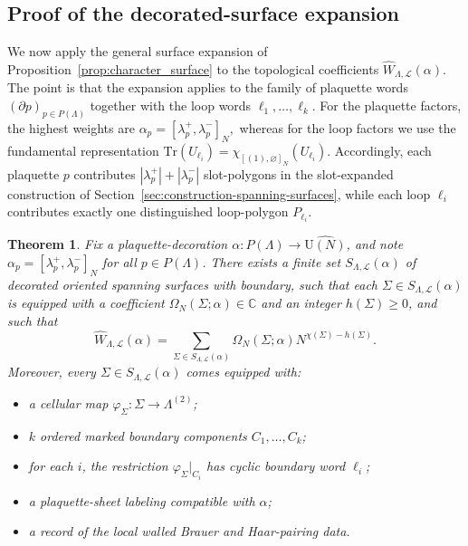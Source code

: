 \documentclass[11pt,a4paper,reqno]{article}
\newtheorem{theorem}{Theorem}[section]
\theoremstyle{definition}
\theoremstyle{remark}
\newcommand\U{{\mathrm U}}
\newcommand\Tr{\mathrm{Tr}}
\newcommand\Lc{{\mathcal{L}}}
\begin{document}
\subsection{Proof of the decorated-surface expansion}

We now apply the general surface expansion of Proposition~\ref{prop:character_surface} to the topological coefficients $\widehat{W}_{\Lambda,\Lc}(\alpha)$. The point is that the expansion applies to the family of plaquette words $(\partial p)_{p\in P(\Lambda)}$ together with the loop words $\ell_1,\dots,\ell_k$. For the plaquette factors, the highest weights are $\alpha_p=[\lambda_p^+,\lambda_p^-]_N,$ whereas for the loop factors we use the fundamental representation $\Tr(U_{\ell_i})=\chi_{[(1),\varnothing]_N}(U_{\ell_i}).$ Accordingly, each plaquette $p$ contributes $|\lambda_p^+|+|\lambda_p^-|$ slot-polygons in the slot-expanded construction of Section~\ref{sec:construction-spanning-surfaces}, while each loop $\ell_i$ contributes exactly one distinguished loop-polygon $P_{\ell_i}$.

\begin{theorem}\label{thm:fixed-alpha-punctured-sum}
Fix a plaquette-decoration $\alpha:P(\Lambda)\to \widehat{\U(N)}$, and note $\alpha_p=[\lambda_p^+,\lambda_p^-]_N$ for all $p\in P(\Lambda)$. There exists a finite set $S_{\Lambda,\Lc}(\alpha)$ of decorated oriented spanning surfaces with boundary, such that each $\Sigma\in S_{\Lambda,\Lc}(\alpha)$ is equipped with a coefficient $\Omega_N(\Sigma;\alpha)\in\mathbb C$ and an integer $h(\Sigma)\geq 0$, and such that
\begin{equation}
\widehat{W}_{\Lambda,\Lc}(\alpha)=\sum_{\Sigma\in S_{\Lambda,\Lc}(\alpha)}\Omega_N(\Sigma;\alpha) N^{\chi(\Sigma)-h(\Sigma)}.
\end{equation}
Moreover, every $\Sigma\in S_{\Lambda,\Lc}(\alpha)$ comes equipped with:
\begin{itemize}
\item a cellular map $\varphi_\Sigma:\Sigma\to \Lambda^{(2)}$;
\item $k$ ordered marked boundary components $C_1,\dots,C_k$;
\item for each $i$, the restriction $\varphi_\Sigma|_{C_i}$ has cyclic boundary word $\ell_i$;
\item a plaquette-sheet labeling compatible with $\alpha$;
\item a record of the local walled Brauer and Haar-pairing data.
\end{itemize}
\end{theorem}
\end{document}
